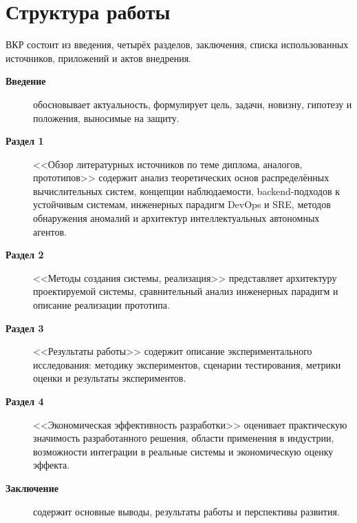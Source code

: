 \section*{Структура работы}

ВКР состоит из введения, четырёх разделов, заключения, списка использованных источников, приложений и актов внедрения.

\begin{description}
\item[\textbf{Введение}] обосновывает актуальность, формулирует цель, задачи, новизну, гипотезу и положения, выносимые на защиту.

\item[\textbf{Раздел 1}] <<Обзор литературных источников по теме диплома, аналогов, прототипов>> содержит анализ теоретических основ распределённых вычислительных систем, концепции наблюдаемости, backend-подходов к устойчивым системам, инженерных парадигм DevOps и SRE, методов обнаружения аномалий и архитектур интеллектуальных автономных агентов.

\item[\textbf{Раздел 2}] <<Методы создания системы, реализация>> представляет архитектуру проектируемой системы, сравнительный анализ инженерных парадигм и описание реализации прототипа.

\item[\textbf{Раздел 3}] <<Результаты работы>> содержит описание экспериментального исследования: методику экспериментов, сценарии тестирования, метрики оценки и результаты экспериментов.

\item[\textbf{Раздел 4}] <<Экономическая эффективность разработки>> оценивает практическую значимость разработанного решения, области применения в индустрии, возможности интеграции в реальные системы и экономическую оценку эффекта.

\item[\textbf{Заключение}] содержит основные выводы, результаты работы и перспективы развития.
\end{description}